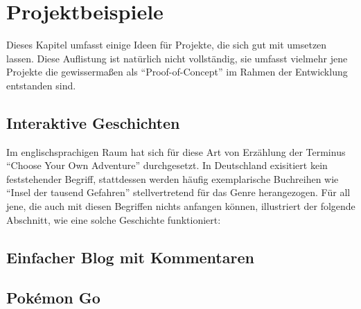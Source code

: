 \section{Projektbeispiele}
\label{sec:project-examples}

Dieses Kapitel umfasst einige Ideen für Projekte, die sich gut mit \textbf{\idename{}} umsetzen lassen. Diese Auflistung ist natürlich nicht vollständig, sie umfasst vielmehr jene Projekte die gewissermaßen als ``Proof-of-Concept'' im Rahmen der Entwicklung entstanden sind.


\subsection{Interaktive Geschichten}

Im englischsprachigen Raum hat sich für diese Art von Erzählung der Terminus ``Choose Your Own Adventure'' durchgesetzt. In Deutschland exisitiert kein feststehender Begriff, stattdessen werden häufig exemplarische Buchreihen wie ``Insel der tausend Gefahren'' stellvertretend für das Genre herangezogen. Für all jene, die auch mit diesen Begriffen nichts anfangen können, illustriert der folgende Abschnitt, wie eine solche Geschichte funktioniert:


\subsection{Einfacher Blog mit Kommentaren}

\subsection{Pokémon Go}

